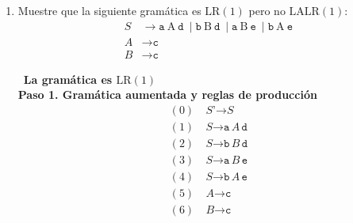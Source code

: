 \documentclass[12pt,letterpaper]{article}
\newcommand{\nt}[1]{\textit{#1}}
\newcommand{\tk}[1]{\texttt{#1}}
\newcommand{\tx}[1]{\text{#1}}
\newcommand{\lr}{\mathrm{LR(1)}}
\newcommand{\slr}{\mathrm{SLR(1)}}
\newcommand{\lalr}{\mathrm{LALR(1)}}
\newcommand{\eps}{\varepsilon}
\begin{document}
\begin{enumerate}[label=\arabic*.]
  \newpage
  
  \textbf{\large d. Tabla de análisis sintáctico $\lalr$}\\
  \[
  \begin{array}{c|c|c|c||c}
    & \multicolumn{3}{c||}{\textbf{acción}} & \textbf{goto} \\ \hline
    \text{Estado} & \tk{(} & \tk{)} & \tk{\$} & \nt{A} \\ \hline
    0  & r2  &     & r2 & 1  \\ \hline
    1  & d2-5 &     & \text{aceptar} &    \\ \hline
    2-5 & r2  & r2  &    & 3-6 \\ \hline
    3-6 & d2-5 & d4-7 &    &    \\ \hline
    4-7 & r1  & r1  & r1 &    \\
  \end{array}
  \]
  $I_0$ reduce $\nt{A}\to\eps$ solo en $\tk{(}$ y $\tk{\$}$, e $I_{2-5}$ solo en $\tk{(}$ y $\tk{)}$,
  el lookahead del elemento $\nt{A}\to\bullet$ no cambió con la fusión.\\
  Solo $I_{4-7}$ amplió sus lookaheads a $\tk{\$}/\tk{(}/\tk{)}$, y es el único elemento de ese estado, así que
  no hay conflicto.\\

  Por lo tanto la gramática 2 es $\lalr$.\\
  Aquí la tabla $\lalr$ difiere de la $\slr$ (que reduce $\nt{A}\to\eps$ en las tres columnas),
  pero ambas aceptan las mismas cadenas.

  
\newpage


\item Muestre que la siguiente gramática es $\lr$ pero no $\lalr$:
    \[
  \begin{aligned}
    \nt{S} &\to \tk{a}\ \tx{A}\ \tk{d}\ \mid \tk{b}\ \tx{B}\ \tk{d}\
    \mid \tk{a}\ \tx{B}\ \tk{e}\ \mid \tk{b}\ \tx{A}\ \tk{e} \\
    \nt{A} &\to \tk{c} \\
    \nt{B} &\to \tk{c}
  \end{aligned}
  \]

  \bigskip

  \ \textbf{\large La gramática es $\lr$}\\

  \textbf{Paso 1. Gramática aumentada y reglas de producción}
  \[
  \begin{aligned}
    (0)\ & \nt{S'} \to \nt{S} \\
    (1)\ & \nt{S} \to \tk{a}\,\nt{A}\,\tk{d} \\
    (2)\ & \nt{S} \to \tk{b}\,\nt{B}\,\tk{d} \\
    (3)\ & \nt{S} \to \tk{a}\,\nt{B}\,\tk{e} \\
    (4)\ & \nt{S} \to \tk{b}\,\nt{A}\,\tk{e} \\
    (5)\ & \nt{A} \to \tk{c} \\
    (6)\ & \nt{B} \to \tk{c}
  \end{aligned}
  \]


\end{enumerate}
\end{document}
